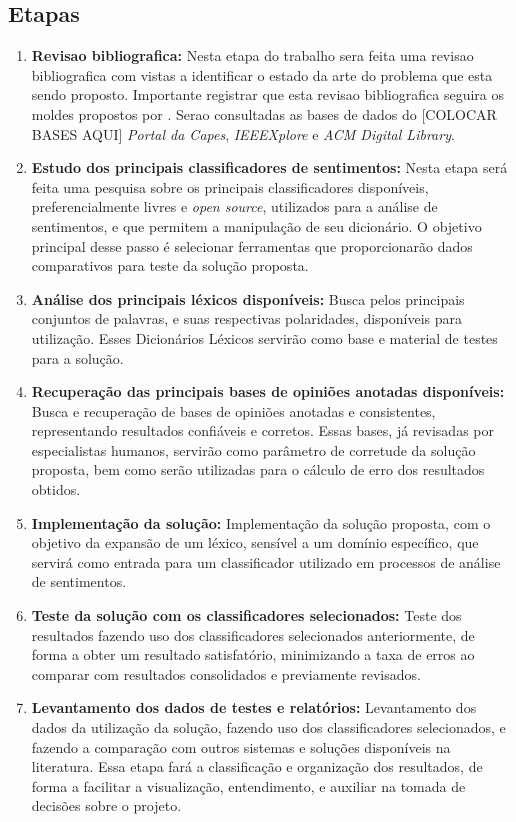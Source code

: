 \documentclass[a4paper,11pt]{article}
\begin{document}
\subsection{Etapas}
\begin{enumerate}[D1.]
\item{\textbf{Revisao bibliografica:} Nesta etapa do trabalho sera feita uma revisao bibliografica com vistas a identificar o estado da arte do problema que esta sendo proposto. Importante registrar que esta revisao bibliografica seguira os moldes propostos por \cite{Kitchenham2004}}. Serao consultadas as bases de dados do [COLOCAR BASES AQUI] \emph{Portal da Capes}, \emph{IEEEXplore} e \emph{ACM Digital Library}.

\item{\textbf{Estudo dos principais classificadores de sentimentos:}}
Nesta etapa será feita uma pesquisa sobre os principais classificadores disponíveis, preferencialmente livres e \emph{open source}, utilizados para a análise de sentimentos, e que permitem a manipulação de seu dicionário. O objetivo principal desse passo é selecionar ferramentas que proporcionarão dados comparativos para teste da solução proposta.

\item{\textbf{Análise dos principais léxicos disponíveis:}}
Busca pelos principais conjuntos de palavras, e suas respectivas polaridades, disponíveis para utilização. Esses Dicionários Léxicos servirão como base e material de testes para a solução.

\item{\textbf{Recuperação das principais bases de opiniões anotadas disponíveis:}}
Busca e recuperação de bases de opiniões anotadas e consistentes, representando resultados confiáveis e corretos. Essas bases, já revisadas por especialistas humanos, servirão como parâmetro de corretude da solução proposta, bem como serão utilizadas para o cálculo de erro dos resultados obtidos.

\item{\textbf{Implementação da solução:}}
Implementação da solução proposta, com o objetivo da expansão de um léxico, sensível a um domínio específico, que servirá como entrada para um classificador utilizado em processos de análise de sentimentos.

\item{\textbf{Teste da solução com os classificadores selecionados:}}
Teste dos resultados fazendo uso dos classificadores selecionados anteriormente, de forma a obter um resultado satisfatório, minimizando a taxa de erros ao comparar com resultados consolidados e previamente revisados.

\item{\textbf{Levantamento dos dados de testes e relatórios:}}
Levantamento dos dados da utilização da solução, fazendo uso dos classificadores selecionados, e fazendo a comparação com outros sistemas e soluções disponíveis na literatura. Essa etapa fará a classificação e organização dos resultados, de forma a facilitar a visualização, entendimento, e auxiliar na tomada de decisões sobre o projeto.
\end{enumerate}
\end{document}

